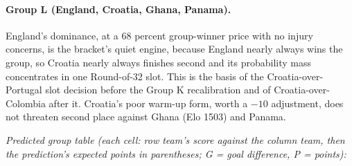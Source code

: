 \documentclass[11pt,letterpaper]{article}
\begin{document}


\paragraph{Group L (England, Croatia, Ghana, Panama).} England's dominance, at a 68 percent group-winner price with no injury concerns, is the bracket's quiet engine, because England nearly always wins the group, so Croatia nearly always finishes second and its probability mass concentrates in one Round-of-32 slot. This is the basis of the Croatia-over-Portugal slot decision before the Group K recalibration and of Croatia-over-Colombia after it. Croatia's poor warm-up form, worth a $-10$ adjustment, does not threaten second place against Ghana (Elo 1503) and Panama.

\noindent\textit{\footnotesize Predicted group table (each cell: row team's score against the column team, then the prediction's expected points in parentheses; G = goal difference, P = points):}
\end{document}
